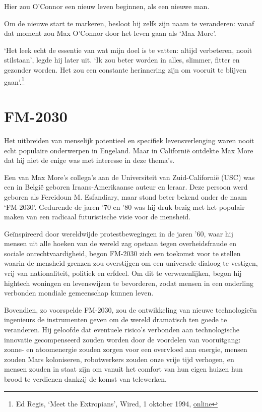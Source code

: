\documentclass[smalldemyvopaper,11pt,twoside,onecolumn,openright,extrafontsizes,hidelinks]{memoir}
\begin{document}
Hier zou O'Connor een nieuw leven beginnen, als een nieuwe man.

Om de nieuwe start te markeren, besloot hij zelfs zijn naam te
veranderen: vanaf dat moment zou Max O'Connor door het leven gaan als
`Max More'.

`Het leek echt de essentie van wat mijn doel is te vatten: altijd
verbeteren, nooit stilstaan', legde hij later uit. `Ik zou beter worden
in alles, slimmer, fitter en gezonder worden. Het zou een constante
herinnering zijn om vooruit te blijven gaan'.\footnote{Ed Regis, `Meet
  the Extropians', Wired, 1 oktober 1994,
  \href{https://www.wired.com/1994/10/extropians/}{online}}

\section{FM-2030}\label{fm-2030}

Het uitbreiden van menselijk potentieel en specifiek levensverlenging
waren nooit echt populaire onderwerpen in Engeland. Maar in Californië
ontdekte Max More dat hij niet de enige was met interesse in deze
thema's.

Een van Max More's collega's aan de Universiteit van Zuid-Californië
(USC) was een in België geboren Iraans-Amerikaanse auteur en leraar.
Deze persoon werd geboren als Fereidoun M. Esfandiary, maar stond beter
bekend onder de naam `FM-2030'. Gedurende de jaren '70 en '80 was hij
druk bezig met het populair maken van een radicaal futuristische visie
voor de mensheid.

Geïnspireerd door wereldwijde protestbewegingen in de jaren '60, waar
hij mensen uit alle hoeken van de wereld zag opstaan tegen
overheidsfraude en sociale onrechtvaardigheid, begon FM-2030 zich een
toekomst voor te stellen waarin de mensheid grenzen zou overstijgen om
een universele dialoog te vestigen, vrij van nationaliteit, politiek en
erfdeel. Om dit te verwezenlijken, begon hij hightech woningen en
levenswijzen te bevorderen, zodat mensen in een onderling verbonden
mondiale gemeenschap kunnen leven.

Bovendien, zo voorspelde FM-2030, zou de ontwikkeling van nieuwe
technologieën ingenieurs de instrumenten geven om de wereld dramatisch
ten goede te veranderen. Hij geloofde dat eventuele risico's verbonden
aan technologische innovatie gecompenseerd zouden worden door de
voordelen van vooruitgang: zonne- en atoomenergie zouden zorgen voor een
overvloed aan energie, mensen zouden Mars koloniseren, robotwerkers
zouden onze vrije tijd verhogen, en mensen zouden in staat zijn om
vanuit het comfort van hun eigen huizen hun brood te verdienen dankzij
de komst van telewerken.
\end{document}
